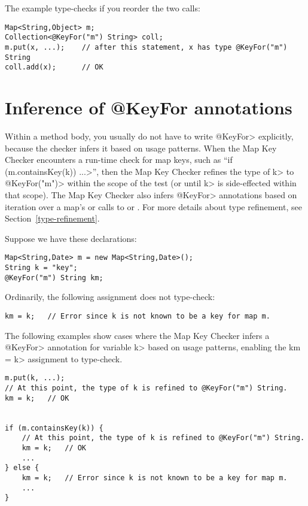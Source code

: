 \noindent
The example type-checks if you reorder the two calls:

\begin{verbatim}
Map<String,Object> m;
Collection<@KeyFor("m") String> coll;
m.put(x, ...);    // after this statement, x has type @KeyFor("m") String
coll.add(x);      // OK
\end{verbatim}



\section{Inference of @KeyFor annotations\label{map-key-annotations-inference}}

Within a method body, you usually do not have to write \<@KeyFor> explicitly,
because the checker infers it based on usage patterns.  When the Map Key
Checker encounters a run-time check for map keys, such as
``\<if (m.containsKey(k)) ...>'', then the Map Key Checker refines the type of
\<k> to \<@KeyFor("m")> within the scope of the test (or until \<k> is
side-effected within that scope).  The Map Key Checker also infers \<@KeyFor>
annotations based on iteration over a map's
 or calls to
or
.
For more details about type refinement, see Section~\ref{type-refinement}.

Suppose we have these declarations:

\begin{verbatim}
Map<String,Date> m = new Map<String,Date>();
String k = "key";
@KeyFor("m") String km;
\end{verbatim}

Ordinarily, the following assignment does not type-check:

\begin{verbatim}
km = k;   // Error since k is not known to be a key for map m.
\end{verbatim}

The following examples show cases where the Map Key Checker
infers a \<@KeyFor> annotation for variable \<k> based on usage patterns,
enabling the \<km = k> assignment to type-check.


\begin{verbatim}
m.put(k, ...);
// At this point, the type of k is refined to @KeyFor("m") String.
km = k;   // OK


if (m.containsKey(k)) {
    // At this point, the type of k is refined to @KeyFor("m") String.
    km = k;   // OK
    ...
} else {
    km = k;   // Error since k is not known to be a key for map m.
    ...
}
\end{verbatim}


